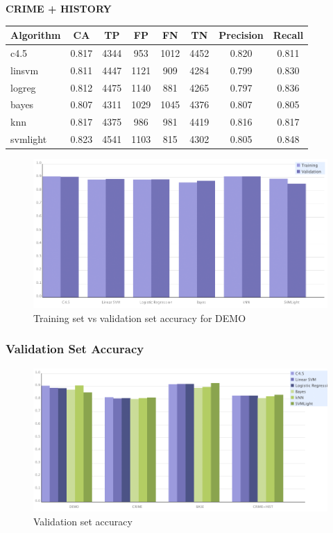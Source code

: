 \documentclass[11pt,letter]{article}
\begin{document}
\textbf{CRIME + HISTORY} \\
\begin{tabular}{|l|c|c|c|c|c|c|c|}
\hline
Algorithm & CA & TP & FP & FN & TN & Precision & Recall\\
\hline
c4.5     & 0.817 & 4344  & 953   & 1012 &  4452 & 0.820 & 0.811\\ 
linsvm   & 0.811 & 4447  & 1121  & 909  &  4284 & 0.799 & 0.830\\
logreg   & 0.812 & 4475  & 1140  & 881  &  4265 & 0.797 & 0.836\\ 
bayes    & 0.807 & 4311  & 1029  & 1045 &  4376 & 0.807 & 0.805\\ 
knn   & 0.817 & 4375  & 986   & 981  &  4419 & 0.816 & 0.817\\ 
svmlight & 0.823 & 4541  & 1103  & 815  &  4302 & 0.805 & 0.848\\
\hline
\end{tabular}

\begin{figure}
	\centering
	\includegraphics[scale=0.35]{report_figures/tv_accuracy_bar.png}
	\caption{Training set vs validation set accuracy for DEMO}
\end{figure}

\subsubsection{Validation Set Accuracy}

\begin{figure}
	\centering
	\includegraphics[scale=0.35]{report_figures/val_accuracy_bar.png}
	\caption{Validation set accuracy}
\end{figure}
\end{document}

